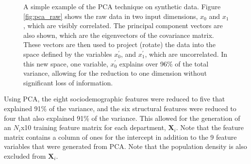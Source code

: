 \documentclass{svjour3}
\begin{document}
    \begin{figure}[!htb]
       \begin{center}
      \end{center}
      \caption{A simple example of the PCA technique on synthetic data. Figure \protect\ref{fig:pca_raw} shows the raw data in two input dimensions, $x_0$ and $x_1$, which are visibly correlated. The principal component vectors are also shown, which are the eigenvectors of the covariance matrix. These vectors are then used to project (rotate) the data into the space defined by the variables $x_0^\prime$, and $x_1^\prime$, which are uncorrelated. In this new space, one variable, $x_0^\prime$ explains over 96\% of the total variance, allowing for the reduction to one dimension without significant loss of information.}
     \label{fig:pca}
  \end{figure}
  
  Using PCA, the eight sociodemographic features were reduced to five that explained 91\% of the variance, and the six structural features were reduced to four that also explained 91\% of the variance. This allowed for the generation of an $N_i$x10 training feature matrix for each department, $\textbf{X}_i$. Note that the feature matrix contains a column of ones for the intercept in addition to the 9 feature variables that were generated from PCA. Note that the population density is also excluded from $\textbf{X}_i$. 
  
\end{document}
